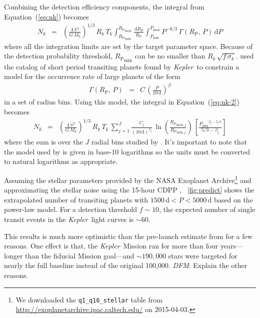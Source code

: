 \documentclass[12pt,preprint]{aastex}
\newcommand{\project}[1]{\textsl{#1}}
\newcommand{\kepler}{\project{Kepler}}
\newcommand{\figref}[1]{\ref{fig:#1}}
\newcommand{\Fig}[1]{\figurename~\figref{#1}}
\newcommand{\fig}[1]{\Fig{#1}}
\renewcommand{\eqref}[1]{\ref{eq:#1}}
\newcommand{\Eq}[1]{Equation~(\eqref{#1})}
\newcommand{\eq}[1]{\Eq{#1}}
\newcommand{\eqlabel}[1]{\label{eq:#1}}
\newcommand{\dd}{\ensuremath{\,\mathrm{d}}}
\newcommand{\todo}[3]{{\color{#2}\emph{#1}: #3}}
\newcommand{\dfmtodo}[1]{\todo{DFM}{red}{#1}}
\newcommand{\period}{{\ensuremath{P}}}
\newcommand{\rp}{{\ensuremath{R_\mathrm{P}}}}
\newcommand{\rate}{{\ensuremath{\Gamma}}}
\begin{document}
Combining the detection efficiency components, the integral from \eq{nk}
becomes
\begin{eqnarray}\eqlabel{nk-2}
N_k &=& \left( \frac{4\,\pi^2}{G\,M_k} \right)^{1/3} \, R_k \, T_k
    \int_{\rp_\mathrm{min}} ^{\rp_\mathrm{max}} \frac{\dd\rp}{\rp}
    \int_{\period_\mathrm{min}} ^{\period_\mathrm{max}}
        \period^{-8/3}\,\rate(\rp,\,\period) \dd\period
\end{eqnarray}
where all the integration limits are set by the target parameter space.
Because of the detection probability threshold, $\rp_\mathrm{min}$ can be no
smaller than $R_k\,\sqrt{f\,\sigma_k}$.
\citet{Dong:2013} used the catalog of short period transiting planets found
by \kepler\ to constrain a model for the occurrence rate of large planets of
the form
\begin{eqnarray}
\rate(\rp,\,\period) &=& C\,\left(\frac{\period}{10\,\mathrm{d}}\right)^\beta
\end{eqnarray}
in a set of radius bins.
Using this model, the integral in \eq{nk-2} becomes
\begin{eqnarray}
N_k &=& \left( \frac{4\,\pi^2}{G\,M_k} \right)^{1/3} \, R_k \, T_k \,
    \sum_{j=1}^J \frac{C_j}{(10\,\mathrm{d})^{\beta_j}}\,
    \ln \left( \frac{\rp_{\mathrm{max},j}}{\rp_{\mathrm{min},j}} \right) \,
    \left[ \frac{{\period_\mathrm{min}}^{\beta_j - 5/3}}{5/3-\beta_j} \right]
\end{eqnarray}
where the sum is over the $J$ radial bins studied by \citet{Dong:2013}.
It's important to note that the model used by \citet{Dong:2013} is given in
base-10 logarithms so the units must be converted to natural logarithms as
appropriate.

Assuming the stellar parameters provided by the NASA Exoplanet
Archive\footnote{We downloaded the \texttt{q1\_q16\_stellar} table from
\url{http://exoplanetarchive.ipac.caltech.edu/} on 2015-04-03.}
\citep{Huber:2014} and approximating the stellar noise using the 15-hour CDPP
\citep{Christiansen:2012}, \fig{predict} shows the extrapolated number of
transiting planets with $1500\,\mathrm{d} < \period < 5000\,\mathrm{d}$ based
on the \citet{Dong:2013} power-law model.
For a detection threshold $f\sim10$, the expected number of single transit
events in the \kepler\ light curves is $\sim 60$.

This results is much more optimistic than the pre-launch estimate from
\citet{Yee:2008} for a few reasons.
One effect is that, the \kepler\ Mission ran for more than four
years---longer than the fiducial Mission goal---and $\sim190,000$ stars were
targeted for nearly the full baseline instead of the original 100,000.
\dfmtodo{Explain the other reasons.}
\end{document}
